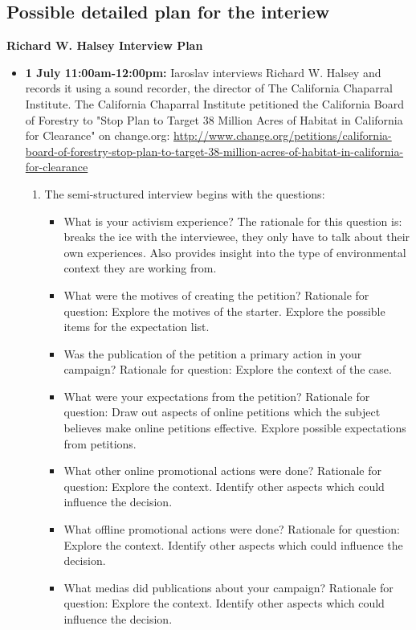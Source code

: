 \subsection{Possible detailed plan for the interiew}
\label{subsec:interviewPlan}
\textbf{ Richard W. Halsey Interview Plan}
\begin{itemize}
\item \textbf{1 July 11:00am-12:00pm:} Iaroslav interviews Richard W. Halsey and records it using a sound recorder, the director of The California Chaparral Institute. The California Chaparral Institute petitioned the California Board of Forestry to "Stop Plan to Target 38 Million Acres of Habitat in California for Clearance" on change.org: \url{http://www.change.org/petitions/california-board-of-forestry-stop-plan-to-target-38-million-acres-of-habitat-in-california-for-clearance}
\begin{enumerate}[label*=\arabic*.]
\item
The semi-structured interview begins with the questions:
\begin{itemize}
\item
What is your activism experience? The rationale for this question is: breaks the ice with the interviewee, they only have to talk about their own experiences. Also provides insight into the type of environmental context they are working from.
\item What were the motives of creating the petition?
Rationale for question: Explore the motives of the starter. Explore the possible items for the expectation list.
\item Was the publication of the petition a primary action in your campaign?
Rationale for question: Explore the context of the case. 
\item What were your expectations from the petition?
Rationale for question: Draw out aspects of online petitions which the subject believes make online petitions effective. Explore possible expectations from petitions.
\item What other online promotional actions were done?
Rationale for question: Explore the context. Identify other aspects which could influence the decision.
\item What offline promotional actions were done?
Rationale for question: Explore the context. Identify other aspects which could influence the decision.
\item What medias did publications about your campaign?
Rationale for question: Explore the context. Identify other aspects which could influence the decision.

\end{itemize}
\end{enumerate}
\end{itemize}
